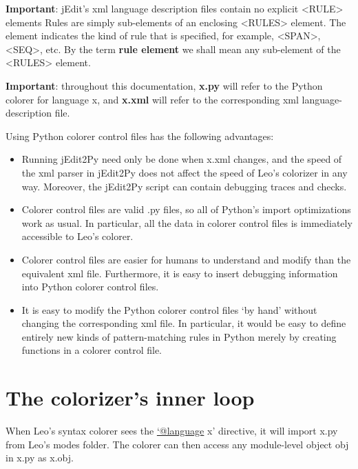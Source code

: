\documentclass[a4paper,10pt,english]{sphinxmanual}
\begin{document}
\textbf{Important}: jEdit's xml language description files contain no explicit \textless{}RULE\textgreater{} elements
Rules are simply sub-elements of an enclosing \textless{}RULES\textgreater{} element.
The element indicates the kind of rule that is specified,
for example, \textless{}SPAN\textgreater{}, \textless{}SEQ\textgreater{}, etc.
By the term \textbf{rule element} we shall mean any sub-element of the \textless{}RULES\textgreater{} element.

\textbf{Important}: throughout this documentation,
\textbf{x.py} will refer to the Python colorer for language x,
and \textbf{x.xml} will refer to the corresponding xml language-description file.

Using Python colorer control files has the following advantages:
\begin{itemize}
\item {} 
Running jEdit2Py need only be done when x.xml changes,
and the speed of the xml parser in jEdit2Py does not affect the speed of Leo's colorizer in any way.
Moreover, the jEdit2Py script can contain debugging traces and checks.

\item {} 
Colorer control files are valid .py files, so all of Python's import optimizations work as usual.
In particular, all the data in colorer control files is immediately accessible to Leo's colorer.

\item {} 
Colorer control files are easier for humans to understand and modify than the equivalent xml file.
Furthermore, it is easy to insert debugging information into Python colorer control files.

\item {} 
It is easy to modify the Python colorer control files `by hand' without changing the corresponding xml file.
In particular, it would be easy to define entirely new kinds of pattern-matching rules in Python merely
by creating functions in a colorer control file.

\end{itemize}


\section{The colorizer's inner loop}
\label{coloring:the-colorizer-s-inner-loop}
When Leo's syntax colorer sees the \href{mailto:'@language}{`@language} x' directive,
it will import x.py from Leo's modes folder.
The colorer can then access any module-level object obj in x.py as x.obj.
\end{document}
